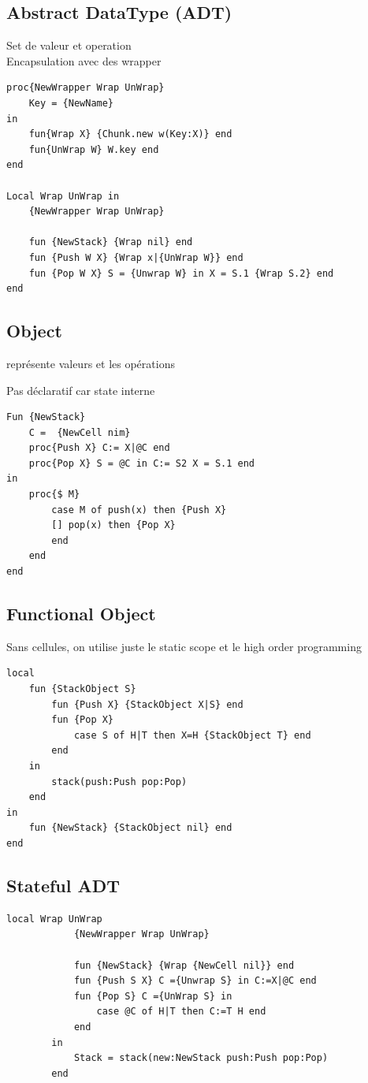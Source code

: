 \documentclass[a4paper,12pt]{scrartcl}
\begin{document}
	\subsection{Abstract DataType (ADT)}
		Set de valeur et operation\\Encapsulation avec des wrapper
		\begin{lstlisting}[language=OZ]
proc{NewWrapper Wrap UnWrap}
	Key = {NewName}
in
	fun{Wrap X} {Chunk.new w(Key:X)} end
	fun{UnWrap W} W.key end
end

Local Wrap UnWrap in
	{NewWrapper Wrap UnWrap}
	
	fun {NewStack} {Wrap nil} end
	fun {Push W X} {Wrap x|{UnWrap W}} end
	fun {Pop W X} S = {Unwrap W} in X = S.1 {Wrap S.2} end
end
		\end{lstlisting}
	\subsection{Object}
		représente valeurs et les opérations
		
		Pas déclaratif car state interne
		\begin{lstlisting}[language=OZ]
Fun {NewStack}
	C =  {NewCell nim}
	proc{Push X} C:= X|@C end
	proc{Pop X} S = @C in C:= S2 X = S.1 end
in
	proc{$ M}
		case M of push(x) then {Push X}
		[] pop(x) then {Pop X}
		end
	end
end
		\end{lstlisting}
	\subsection{Functional Object}
		Sans cellules, on utilise juste le static scope et le high order programming
			\begin{lstlisting}[language=OZ]
local
	fun {StackObject S}
		fun {Push X} {StackObject X|S} end
		fun {Pop X}
			case S of H|T then X=H {StackObject T} end
		end
	in
		stack(push:Push pop:Pop)
	end
in
	fun {NewStack} {StackObject nil} end
end
			\end{lstlisting}
			
	\subsection{Stateful ADT}
		\begin{lstlisting}[language=OZ]
		local Wrap UnWrap
			{NewWrapper Wrap UnWrap}
			
			fun {NewStack} {Wrap {NewCell nil}} end
			fun {Push S X} C ={Unwrap S} in C:=X|@C end
			fun {Pop S} C ={UnWrap S} in
				case @C of H|T then C:=T H end
			end
		in
			Stack = stack(new:NewStack push:Push pop:Pop)
		end
		\end{lstlisting}
		
\end{document}
